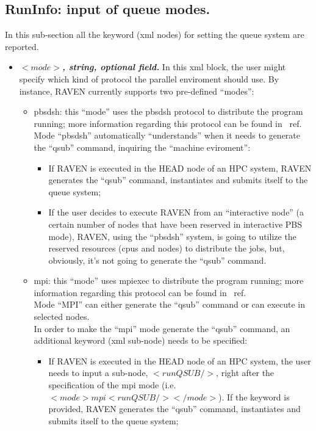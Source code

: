 \subsection{RunInfo: input of queue modes.}
\label{subsec:runinfoModes}
In this sub-section all  the keyword (xml nodes) for setting the queue system are reported.
\begin{itemize}
\item $<mode>$\textbf{\textit{, string, optional field.}} In this xml block, the user might specify which kind of protocol the parallel enviroment should use. By instance, RAVEN currently supports two pre-defined ``modes'':
  \begin{itemize}
    \item pbsdsh: this ``mode'' uses the pbsdsh protocol to distribute the program running; more information regarding this protocol can be found in ~ref{}. 
    \\ Mode ``pbsdsh'' automatically ``understands'' when it needs to generate the ``qsub'' command, inquiring the ``machine eviroment'': 
         \begin{itemize}         
           \item If RAVEN is executed in the HEAD node of an HPC system, RAVEN generates the ``qsub'' command, instantiates and submits itself to the queue system; 
           \item If the user decides to execute RAVEN from an ``interactive node'' (a certain number of nodes that have been reserved in interactive PBS mode), RAVEN, using the ``pbsdsh'' system, is going to utilize the reserved resources (cpus and nodes) to distribute the jobs, but, obviously, it's not going to generate the ``qsub'' command. 
         \end{itemize}
    \item mpi: this ``mode'' uses mpiexec to distribute the program running; more information regarding this protocol can be found in ~ref{}.
     \\ Mode ``MPI''  can either generate the  ``qsub'' command or can execute in selected nodes.
      \\In order to make the ``mpi'' mode generate the ``qsub'' command, an additional keyword (xml sub-node) needs to be specified:
         \begin{itemize}         
           \item If RAVEN is executed in the HEAD node of an HPC system, the user needs to input a sub-node, $<runQSUB/>$, right after the specification of the mpi mode (i.e. $<mode>mpi<runQSUB/></mode>$). If the keyword is provided, RAVEN generates the ``qsub'' command, instantiates and submits itself to the queue system; 

\end{itemize}
\end{itemize}
\end{itemize}
